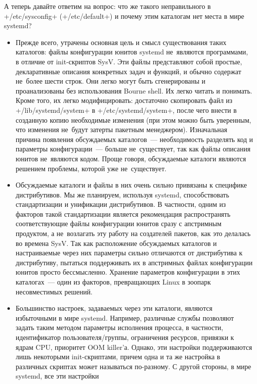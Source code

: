\documentclass[10pt,oneside,a4paper]{article}
\begin{document}
А теперь давайте ответим на вопрос: что же такого неправильного в
+/etc/sysconfig+ (+/etc/default+) и почему этим каталогам нет места в мире
systemd?
\begin{itemize}
	\item Прежде всего, утрачены основная цель и смысл существования таких
		каталогов: файлы конфигурации юнитов systemd не~являются
		программами, в отличие от init-скриптов SysV. Эти файлы
		представляют собой простые, декларативные описания конкретных
		задач и функций, и обычно содержат не~более шести строк. Они
		легко могут быть сгенерированы и проанализованы без
		использования Bourne shell. Их легко читать и понимать. Кроме
		того, их легко модифицировать: достаточно скопировать файл из
		+/lib/systemd/system+ в +/etc/systemd/system+, после чего внести
		в созданную копию необходимые изменения (при этом можно быть
		уверенным, что изменения не~будут затерты пакетным менеджером).
		Изначальная причина появления обсуждаемых каталогов~---
		необходимость разделять код и параметры конфигурации~--- больше
		не~существует, так как файлы описания юнитов не~являются кодом.
		Проще говоря, обсуждаемые каталоги являются решением проблемы,
		которой уже не~существует.
	\item Обсуждаемые каталоги и файлы в них очень сильно привязаны к
		специфике дистрибутивов. Мы же планируем, используя systemd,
		способствовать стандартизации и унификации дистрибутивов. В
		частности, одним из факторов такой стандартизации является
		рекомендация распространять соответствующие файлы конфигурации
		юнитов сразу с апстримным продуктом, а не~возлагать эту работу
		на создателей пакетов, как это делалась во времена SysV.
		Так как расположение обсуждаемых каталогов и настраиваемые через
		них параметры сильно отличаются от дистрибутива к дистрибутиву,
		пытаться поддерживать их в апстримных файлах конфигурации юнитов
		просто бессмысленно. Хранение параметров конфигурации в этих  
		каталогах~--- один из факторов, превращающих Linux в зоопарк
		несовместимых решений.
	\item Большинство настроек, задаваемых через эти каталоги, являются
		избыточными в мире systemd. Например, различные службы позволяют
		задать таким методом параметры исполнения процесса, в частности,
		идентификатор пользователя/группы, ограничения ресурсов,
		привязки к ядрам CPU, приоритет OOM killer'а. Однако, эти
		настройки поддерживаются лишь некоторыми init-скриптами, причем
		одна и та же настройка в различных скриптах может называться
		по-разному. С другой стороны, в мире systemd, все эти настройки

\end{itemize}
\end{document}
